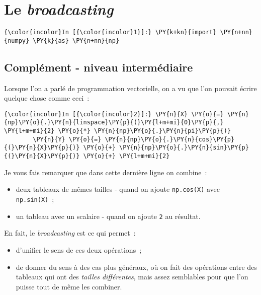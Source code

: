     
    
    
    

    

    \hypertarget{le-broadcasting}{%
\section{\texorpdfstring{Le
\emph{broadcasting}}{Le broadcasting}}\label{le-broadcasting}}

    \begin{Verbatim}[commandchars=\\\{\}]
{\color{incolor}In [{\color{incolor}1}]:} \PY{k+kn}{import} \PY{n+nn}{numpy} \PY{k}{as} \PY{n+nn}{np}
\end{Verbatim}


    \hypertarget{compluxe9ment---niveau-intermuxe9diaire}{%
\subsection{Complément - niveau
intermédiaire}\label{compluxe9ment---niveau-intermuxe9diaire}}

    Lorsque l'on a parlé de programmation vectorielle, on a vu que l'on
pouvait écrire quelque chose comme ceci~:

    \begin{Verbatim}[commandchars=\\\{\}]
{\color{incolor}In [{\color{incolor}2}]:} \PY{n}{X} \PY{o}{=} \PY{n}{np}\PY{o}{.}\PY{n}{linspace}\PY{p}{(}\PY{l+m+mi}{0}\PY{p}{,} \PY{l+m+mi}{2} \PY{o}{*} \PY{n}{np}\PY{o}{.}\PY{n}{pi}\PY{p}{)}
        \PY{n}{Y} \PY{o}{=} \PY{n}{np}\PY{o}{.}\PY{n}{cos}\PY{p}{(}\PY{n}{X}\PY{p}{)} \PY{o}{+} \PY{n}{np}\PY{o}{.}\PY{n}{sin}\PY{p}{(}\PY{n}{X}\PY{p}{)} \PY{o}{+} \PY{l+m+mi}{2}
\end{Verbatim}


    Je vous fais remarquer que dans cette dernière ligne on combine~:

\begin{itemize}
\tightlist
\item
  deux tableaux de mêmes tailles - quand on ajoute \texttt{np.cos(X)}
  avec \texttt{np.sin(X)}~;
\item
  un tableau avec un scalaire - quand on ajoute \texttt{2} au résultat.
\end{itemize}

    En fait, le \emph{broadcasting} est ce qui permet~:

\begin{itemize}
\tightlist
\item
  d'unifier le sens de ces deux opérations~;
\item
  de donner du sens à des cas plus généraux, où on fait des opérations
  entre des tableaux qui ont des \emph{tailles différentes}, mais assez
  semblables pour que l'on puisse tout de même les combiner.
\end{itemize}

